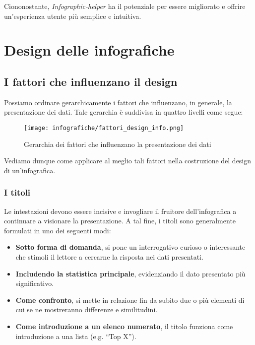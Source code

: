 Ciononostante, \emph{Infographic-helper} ha il potenziale per essere migliorato e offrire un'esperienza utente più semplice e intuitiva.



\section{Design delle infografiche}
\subsection{I fattori che influenzano il design}
Possiamo ordinare gerarchicamente i fattori che influenzano, in generale, la presentazione dei dati. Tale gerarchia è suddivisa in quattro livelli come segue:
\begin{figure}[H] 
    \centering 
    \texttt{[image: infografiche/fattori\_design\_info.png]} 
    \caption{Gerarchia dei fattori che influenzano la presentazione dei dati}
    \label{fig:fattori_design_info}
\end{figure}
Vediamo dunque come applicare al meglio tali fattori nella costruzione del design di un'infografica.

\subsubsection{I titoli}
Le intestazioni devono essere incisive e invogliare il fruitore dell'infografica a continuare a visionare la presentazione. 
A tal fine, i titoli sono generalmente formulati in uno dei seguenti modi:
\begin{itemize}
    \item \textbf{Sotto forma di domanda}, si pone un interrogativo curioso o interessante che stimoli il lettore a cercarne la risposta nei dati presentati.
    \item \textbf{Includendo la statistica principale}, evidenziando il dato presentato più significativo.
    \item \textbf{Come confronto}, si mette in relazione fin da subito due o più elementi di cui se ne mostreranno differenze e similitudini.
    \item \textbf{Come introduzione a un elenco numerato}, il titolo funziona come introduzione a una lista (e.g. ``Top X'').
\end{itemize}

